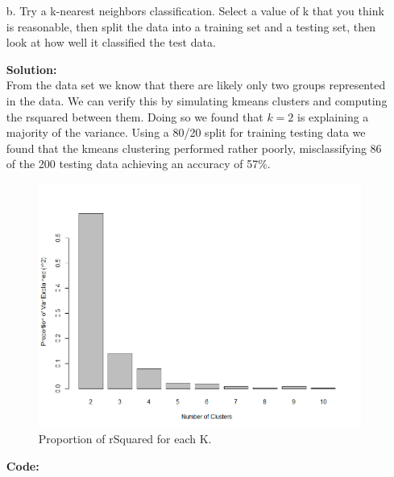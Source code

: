 \documentclass[12pt]{article}
\makeatletter
\theoremstyle{homework}
\newenvironment{exercise}[1]
{\def\@currentlabel{#1}\exercisecore}
{\endexercisecore}
\newcommand{\localhead}[1]{\par\smallskip\noindent\textbf{#1}\nobreak\\}%
\newcommand\solution{\localhead{Solution:}}
\makeatother
\begin{document}
\begin{exercise}{1}
\begin{enumerate}
    \item[b.] Try a k-nearest neighbors classification. Select a value of k that you think is reasonable, then split the data into a training set and a testing set, then look at how well it classified the test data.\\
    \solution From the data set we know that there are likely only two groups represented in the data. We can verify this by simulating kmeans clusters and computing the rsquared between them. Doing so we found that $k = 2$
    is explaining a majority of the variance. Using a 80/20 split for training testing data we found that the kmeans clustering performed rather poorly, misclassifying 86 of the 200 testing data achieving an accuracy of 57\%.
      \begin{figure}[H]
        \begin{center}
          \caption{Proportion of rSquared for each K.}
        \includegraphics[width = \textwidth]{Rplot01.png}
        \end{center}
      \end{figure}
        \textbf{Code:}
        \begin{center}
        
        \end{center}


  \end{enumerate}
\end{exercise}
\end{document}
